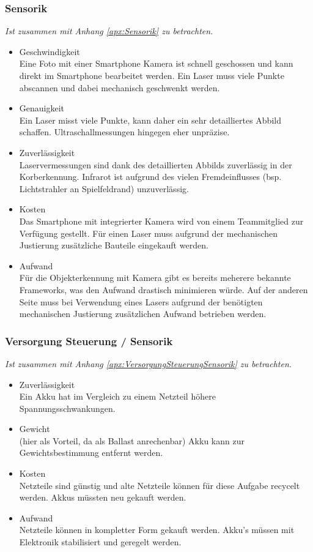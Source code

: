 		\subsubsection{Sensorik}
			\textit{Ist zusammen mit Anhang \ref{apx:Sensorik} zu betrachten.}
			\begin{itemize}
				\item Geschwindigkeit\\
				Eine Foto mit einer Smartphone Kamera ist schnell geschossen und kann direkt im Smartphone bearbeitet werden. Ein Laser muss viele Punkte abscannen und dabei mechanisch geschwenkt werden.
				\item Genauigkeit\\
				Ein Laser misst viele Punkte, kann daher ein sehr detailliertes Abbild schaffen. Ultraschallmessungen hingegen eher unpräzise.  
				\item Zuverlässigkeit\\
				Laservermessungen sind dank des detaillierten Abbilds zuverlässig in der Korberkennung. Infrarot ist aufgrund des vielen Fremdeinflusses (bsp. Lichtstrahler an Spielfeldrand) unzuverlässig.
				\item Kosten\\
				Das Smartphone mit integrierter Kamera wird von einem Teammitglied zur Verfügung gestellt. Für einen Laser muss aufgrund der mechanischen Justierung zusätzliche Bauteile eingekauft werden.
				\item Aufwand\\
				Für die Objekterkennung mit Kamera gibt es bereits meherere bekannte Frameworks, was den Aufwand drastisch minimieren würde. Auf der anderen Seite muss bei Verwendung eines Lasers aufgrund der benötigten mechanischen Justierung zusätzlichen Aufwand betrieben werden.
			\end{itemize}
			
		\subsubsection{Versorgung Steuerung / Sensorik}
			\textit{Ist zusammen mit Anhang \ref{apx:VersorgungSteuerungSensorik} zu betrachten.}
			\begin{itemize}
				\item Zuverlässigkeit\\
				Ein Akku hat im Vergleich zu einem Netzteil höhere Spannungsschwankungen.
				\item Gewicht\\
				(hier als Vorteil, da als Ballast anrechenbar) Akku kann zur Gewichtsbestimmung entfernt werden.
				\item Kosten\\
				Netzteile sind günstig und alte Netzteile können für diese Aufgabe recycelt werden. Akkus müssten neu gekauft werden.
				\item Aufwand\\
				Netzteile können in kompletter Form gekauft werden. Akku’s müssen mit Elektronik stabilisiert und geregelt werden.
			\end{itemize}	
		
